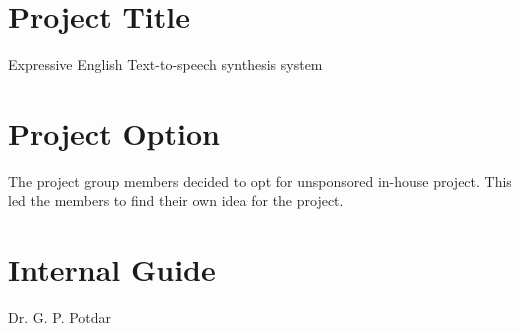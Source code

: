 \documentclass[oneside,a4paper,12pt]{book}
\begin{document}
\section{Project Title}
Expressive English Text-to-speech synthesis system

\section{ Project Option }
The project group members decided to opt for unsponsored in-house project. This led the members to find their own idea for the project.

\section{Internal Guide}
Dr. G. P. Potdar
\end{document}
